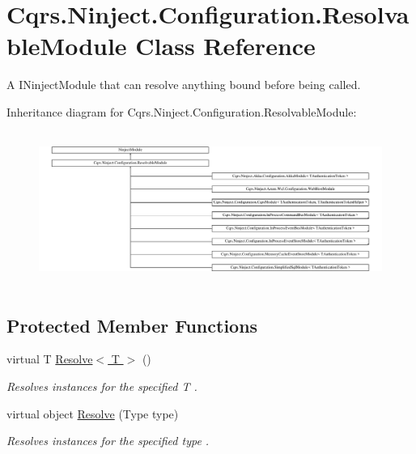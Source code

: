 \hypertarget{classCqrs_1_1Ninject_1_1Configuration_1_1ResolvableModule}{}\section{Cqrs.\+Ninject.\+Configuration.\+Resolvable\+Module Class Reference}
\label{classCqrs_1_1Ninject_1_1Configuration_1_1ResolvableModule}


A I\+Ninject\+Module that can resolve anything bound before being called.  


Inheritance diagram for Cqrs.\+Ninject.\+Configuration.\+Resolvable\+Module\+:\begin{figure}[H]
\begin{center}
\leavevmode
\includegraphics[height=5.054152cm]{classCqrs_1_1Ninject_1_1Configuration_1_1ResolvableModule}
\end{center}
\end{figure}
\subsection*{Protected Member Functions}
\begin{DoxyCompactItemize}
\item 
virtual T \hyperlink{classCqrs_1_1Ninject_1_1Configuration_1_1ResolvableModule_a41a1826cee70c7627e6ec1ef0053f1ea_a41a1826cee70c7627e6ec1ef0053f1ea}{Resolve$<$ T $>$} ()
\begin{DoxyCompactList}\small\item\em Resolves instances for the specified {\itshape T} . \end{DoxyCompactList}\item 
virtual object \hyperlink{classCqrs_1_1Ninject_1_1Configuration_1_1ResolvableModule_a182fa5666c70e6871aa371fc81fb788d_a182fa5666c70e6871aa371fc81fb788d}{Resolve} (Type type)
\begin{DoxyCompactList}\small\item\em Resolves instances for the specified {\itshape type} . \end{DoxyCompactList}\end{DoxyCompactItemize}


